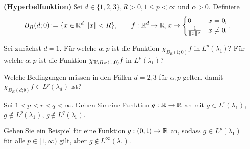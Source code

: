 \begin{Problem}
	\textbf{(Hyperbelfunktion)} Sei $d\in \{1,2,3\} , R>0, 1\le p<\infty$ und $\alpha>0$. Definiere
	\[
	B_R(d;0):=\{x\in \mathbb{R}^d|\|x\|<R\} , \qquad f:\mathbb{R}^d\to \mathbb{R}, x\to \begin{cases}
		0 & x=0,\\
		\frac{1}{\|x\|^\alpha} & x\neq 0.
	\end{cases}
	.\] 
	\begin{parts}
		\item Sei zunächst $d=1$. F\"{u}r welche $\alpha, p$ ist die Funktion $\chi_{B_R(1;0)}f$ in $L^p(\lambda_1)$? F\"{u}r welche $\alpha,p$ ist die Funktion $\chi_{\mathbb{R}\backslash B_R(1;0)}f$ in $L^p(\lambda_1)$?
		\item Welche Bedingungen müssen in den Fällen $d=2,3$ f\"{u}r $\alpha, p$ gelten, damit $\chi_{B_R(d;0)}f\in L^p(\lambda_d)$ ist?
		\item Sei $1<p<r<q<\infty$. Geben Sie eine Funktion $g:\mathbb{R}\to \mathbb{R}$ an mit $g\in L^r(\lambda_1)$, $g \not\in L^p(\lambda_1)$, $g \not\in L^q(\lambda_1)$.
		\item Geben Sie ein Beispiel f\"{u}r eine Funktion $g:(0,1)\to \mathbb{R}$ an, sodass $g\in L^p(\lambda_1)$ f\"{u}r alle $p\in [1,\infty)$ gilt, aber $g \not\in L^\infty(\lambda_1)$.
	\end{parts}
\end{Problem}
